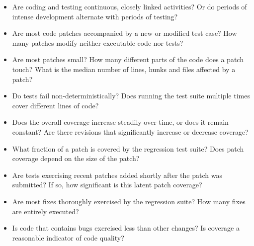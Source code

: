 \begin{itemize}
\item[\textssc{RQ1}] \textit{\rqone}
            Are coding and testing continuous, closely linked
            activities?  Or do periods of intense development
            alternate with periods of testing?

\item[\textssc{RQ2}] \textit{\rqtwo}
            Are most code
            patches accompanied by a new or modified test case?  How
            many patches modify neither executable code nor tests?
           
\item[\textssc{RQ3}] \textit{\rqthree}
            Are most patches small?  
            How many different parts of the code does a patch touch?
            What is the median number of lines, hunks and
            files affected by a patch?

\item[\textssc{RQ4}] \textit{\rqfour}  Do tests fail non-deterministically?
            Does running the test suite multiple times cover different
            lines of code?

\item[\textssc{RQ5}] \textit{\rqfive}
            Does the overall coverage increase steadily over time, or
            does it remain constant?  Are there revisions that
            significantly increase or decrease coverage?

\item[\textssc{RQ6}] \textit{\rqsix}
            What fraction of a patch is covered by the regression test
            suite?  Does patch coverage depend on the size of the
            patch?

\item[\textssc{RQ7}] \textit{\rqseven}  Are
            tests exercising recent patches added shortly after the
            patch was submitted?  If so, how significant is this
            latent patch coverage?

\item[\textssc{RQ8}] \textit{\rqeight}
            Are most fixes thoroughly exercised by the regression
            suite?  How many fixes are entirely executed?

\item[\textssc{RQ9}] \textit{\rqnine}
            Is code that contains bugs exercised less than other changes?
            Is coverage a reasonable indicator of code quality? 

\end{itemize}

